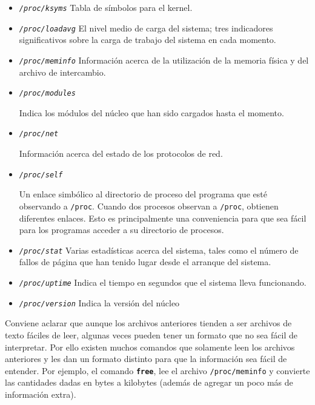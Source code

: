 \begin{itemize}
	

	\item 

	\textit{\texttt{/proc/ksyms}}
	 Tabla de símbolos para el
	kernel.
	
	\item \textit{\texttt{/proc/loadavg}}
	 El nivel medio de carga del sistema; tres indicadores
	significativos sobre la carga de trabajo del sistema en cada
	momento.
	
	\item \textit{\texttt{/proc/meminfo}}
	 Información acerca de la utilización de la memoria
	física y 	del archivo de
	intercambio.
	
	\item
	
	\textit{\texttt{/proc/modules}}
	
	 Indica los módulos del núcleo que han sido cargados
	hasta el 	momento.
	

	\item \textit{\texttt{/proc/net}}         
    
	 Información acerca del estado de los protocolos de
	red.
	
	\item
	
	\textit{\texttt{/proc/self}}
	
	 Un enlace simbólico al directorio de proceso del
	programa que esté observando a \texttt{/proc}. Cuando dos
	procesos observan a \texttt{/proc}, obtienen diferentes
	enlaces. Esto es principalmente una conveniencia para que sea fácil para
	los programas acceder a su directorio de
	procesos.
	
	\item \textit{\texttt{/proc/stat}}
	 Varias estadísticas acerca del sistema, tales como el
	número de fallos de página que han tenido lugar desde el arranque del
	sistema.
	
	\item \textit{\texttt{/proc/uptime}}
	 Indica el tiempo en segundos que el sistema lleva
	funcionando.
	
	\item \textit{\texttt{/proc/version}}
	 Indica la versión del núcleo
	
	
	 \end{itemize} 

    Conviene aclarar que aunque los archivos anteriores tienden a ser
    archivos de texto fáciles de leer, algunas veces pueden tener un formato
    que no sea fácil de interpretar. Por ello existen muchos comandos que
    solamente leen los archivos anteriores y les dan un formato distinto para
    que la información sea fácil de entender. Por ejemplo, el comando
    \texttt{\textbf{free}}, lee el archivo \texttt{/proc/meminfo}
    y convierte las cantidades dadas en bytes a kilobytes (además de agregar un
    poco más de información extra). 









